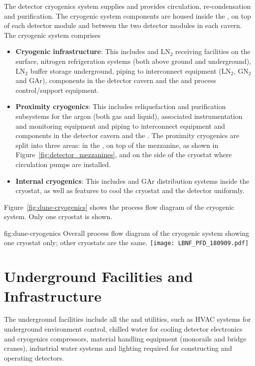 The detector cryogenics system supplies  and provides
circulation, re-condensation and purification. The cryogenic system
components are housed inside the , on top of each detector module
and between the two detector modules in each cavern. The cryogenic system comprises
\begin{itemize}
\item {\bf Cryogenic infrastructure}: This includes  and LN$_2$ receiving
  facilities on the surface, nitrogen refrigeration systems (both
  above ground and underground), LN$_2$ buffer storage
  underground, piping to interconnect equipment (LN$_2$, GN$_2$ and GAr),
  components in the detector cavern and the  and process control/support
  equipment.
\item {\bf Proximity cryogenics}: This includes reliquefaction 
  and purification subsystems for the argon (both gas and liquid), associated
  instrumentation and monitoring equipment and  piping to
  interconnect equipment and components in the detector cavern and the
  . The proximity cryogenics are split into three areas: in the
  , on top of the mezzanine, as shown in Figure~\ref{fig:detector_mezzanines},
  and on the side of the cryostat where  circulation pumps are installed.
\item {\bf Internal cryogenics}: This includes  and GAr distribution
  systems inside the cryostat, as well as features to cool the
  cryostat and the detector uniformly.
\end{itemize}
Figure~\ref{fig:dune-cryogenics} shows the process flow diagram of the
 cryogenic system. Only one cryostat is shown.
\begin{dunefigure}{fig:dune-cryogenics}
  {Overall process flow diagram of the cryogenic system showing one
    cryostat only; other cryostats are the same.}
  \texttt{[image: LBNF\_PFD\_180909.pdf]}
\end{dunefigure}

\section{Underground Facilities and Infrastructure}
\label{sec:fdsp-coord-uderground-excavation}

The underground facilities include all the  and utilities,
such as HVAC systems for underground environment control, chilled
water for cooling detector electronics and cryogenics compressors,
material handling equipment (monorails and bridge cranes), industrial
water systems and lighting required for constructing and operating
detectors.

